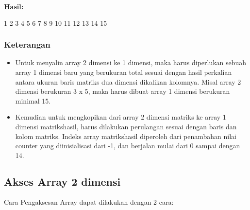 \textbf{Hasil:}

\begin{lcverbatim}
1
2
3
4
5
6
7
8
9
10
11
12
13
14
15
\end{lcverbatim}

\subsubsection*{Keterangan}

\begin{itemize}

\item
  Untuk menyalin array 2 dimensi ke 1 dimensi, maka harus diperlukan
  sebuah array 1 dimensi baru yang berukuran total sesuai dengan hasil
  perkalian antara ukuran baris matriks dua dimensi dikalikan kolomnya.
  Misal array 2 dimensi berukuran 3 x 5, maka harus dibuat array 1
  dimensi berukuran minimal 15.
\item
  Kemudian untuk mengkopikan dari array 2 dimensi matriks ke array 1
  dimensi matrikshasil, harus dilakukan perulangan sesuai dengan baris
  dan kolom matriks. Indeks array matrikshasil diperoleh dari penambahan
  nilai counter yang diinisialisasi dari -1, dan berjalan mulai dari 0
  sampai dengan 14.
\end{itemize}

\subsection{Akses Array 2 dimensi}
 
Cara Pengaksesan Array dapat dilakukan dengan 2 cara:

